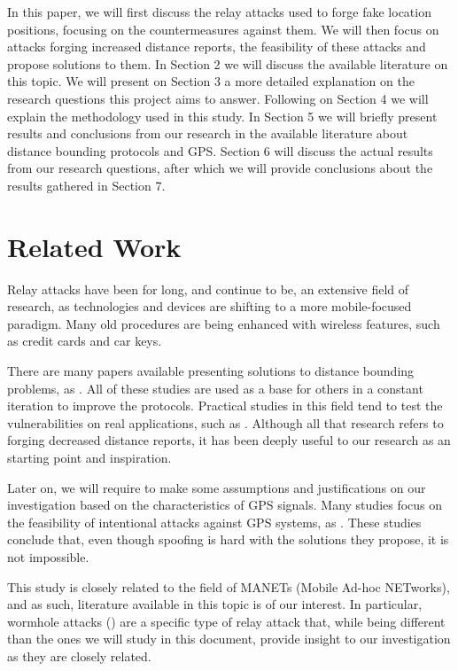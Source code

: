 \documentclass{article}
\begin{document}
In this paper, we will first discuss the relay attacks used to forge fake location positions, focusing on the countermeasures against them. We will then focus on attacks forging increased distance reports, the feasibility of these attacks and propose solutions to them. In Section 2 we will discuss the available literature on this topic. We will present on Section 3 a more detailed explanation on the research questions this project aims to answer. Following on Section 4 we will explain the methodology used in this study. In Section 5 we will briefly present results and conclusions from our research in the available literature about distance bounding protocols and GPS. Section 6 will discuss the actual results from our research questions, after which we will provide conclusions about the results gathered in Section 7.

\section{Related Work}

Relay attacks have been for long, and continue to be, an extensive field of research, as technologies and devices are shifting to a more mobile-focused paradigm. Many old procedures are being enhanced with wireless features, such as credit cards and car keys.

There are many papers available presenting solutions to distance bounding problems, as \cite{brands1994distance, tu2007rfid, rasmussen2010realization}. All of these studies are used as a base for others in a constant iteration to improve the protocols. Practical studies in this field tend to test the vulnerabilities on real applications, such as \cite{francillon2011relay, francis2010practical, hancke2005practical, markantonakis2012practical, vandenbreekel2014relay}. Although all that research refers to forging decreased distance reports, it has been deeply useful to our research as an starting point and inspiration.

Later on, we will require to make some assumptions and justifications on our investigation based on the characteristics of GPS signals. Many studies focus on the feasibility of intentional attacks against GPS systems, as \cite{warner2003gps, wen2005countermeasures, jafarnia2012gps}. These studies conclude that, even though spoofing is hard with the solutions they propose, it is not impossible.

This study is closely related to the field of MANETs (Mobile Ad-hoc NETworks), and as such, literature available in this topic is of our interest. In particular, wormhole attacks (\cite{hu2006wormhole, maheshwari2007detecting, goyal2010literature}) are a specific type of relay attack that, while being different than the ones we will study in this document, provide insight to our investigation as they are closely related.
\end{document}
